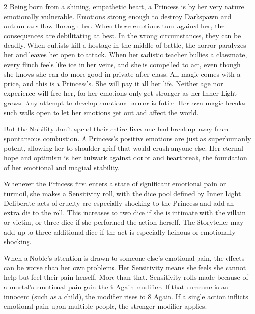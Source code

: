 \begin{multicols}{2}
Being born from a shining, empathetic heart, a Princess is by her very nature‭ emotionally ‬vulnerable. Emotions strong enough to destroy Darkspawn and outrun cars flow through her. When those emotions turn against her, the consequences are debilitating‭ at best. In the wrong circumstances, they can be deadly. When cultists kill a hostage in the middle of battle, the horror paralyzes her and leaves her open to attack. When her sadistic teacher bullies a classmate, every flinch feels like ice in her veins, and she is compelled to act, even though she knows she can do more good in private after class. All magic comes with a price, and this is a Princess's. She will pay it all her life. Neither age nor experience will free her, for her emotions only get stronger as her Inner Light grows. Any attempt to develop emotional armor is futile. Her own magic breaks such walls open to let her emotions get out and affect the world. 

But the Nobility don't spend their entire lives one bad breakup away from spontaneous combustion. A Princess's positive emotions are just as superhumanly potent, allowing her to shoulder grief that would crush anyone else. Her eternal hope and optimism is her bulwark against doubt and heartbreak, the foundation of her emotional and magical stability. 

Whenever the Princess first enters a state of significant emotional pain or turmoil, she makes a Sensitivity roll, with the dice pool defined by Inner Light. Deliberate acts of cruelty are especially shocking to the Princess and add an extra die to the roll. This increases to two dice if she is intimate with the villain or victim, or three dice if she performed the action herself. The Storyteller may add up to three additional dice if the act is especially heinous or emotionally shocking. 

When a Noble's attention is drawn to someone else's emotional pain, the effects can be worse than her own problems. Her Sensitivity means she feels she cannot help but feel their pain herself. More than that. Sensitivity rolls made because of a mortal's emotional pain gain the 9 Again modifier. If that someone is an innocent (such as a child), the modifier rises to 8 Again. If a single action inflicts emotional pain upon multiple people, the stronger modifier applies.


\end{multicols}
